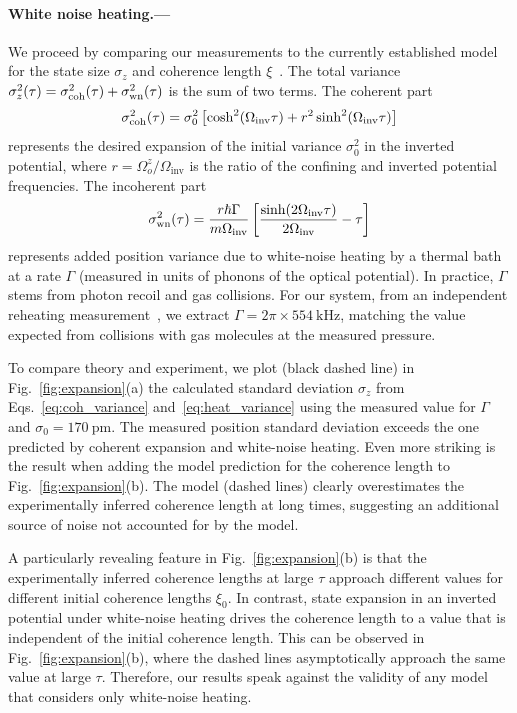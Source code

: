 \documentclass[aps,prl,reprint,twocolumn,superscriptaddress]{revtex4-2}
\begin{document}
\paragraph{White noise heating.---}
We proceed by comparing our measurements to the currently established model for the state size $\sigma_z$ and coherence length $\xi$~\cite{bonvin2024state, tomassi2025accelerated}.
The total variance $\sigma_z^2(\tau)=\sigma^2_{\rm coh}(\tau)+\sigma^2_{\rm wn}(\tau)$ is the sum of two terms. The coherent part 
\begin{equation}
\sigma_{\rm coh}^2(\tau) = \sigma_0^2 \left[\cosh^2(\Omega_{\rm inv}\tau) + r^2 \sinh^2(\Omega_{\rm inv}\tau)\right]
\label{eq:coh_variance}
\end{equation}
represents the desired expansion of the initial variance $\sigma_0^2$ in the inverted potential, where $r=\Omega_o^z/\Omega_\text{inv}$ is the ratio of the confining and inverted potential frequencies. 
The incoherent part 
\begin{equation}
\sigma_{\rm wn}^2(\tau) = \frac{r\hbar\Gamma}{m\Omega_{\rm inv}}\left[\frac{\sinh(2\Omega_{\rm inv}\tau)}{2\Omega_{\rm inv}}-\tau   \right]
\label{eq:heat_variance}
\end{equation}
represents added position variance due to white-noise heating by a thermal bath at a rate $\Gamma$ (measured in units of phonons of the optical potential). In practice, $\Gamma$ stems from photon recoil and gas collisions.
For our system, from an independent reheating measurement~\cite{tebbenjohanns2019cold}, we extract $\Gamma=2\pi \times\SI{554}{\kilo\hertz}$, matching the value expected from collisions with gas molecules at the measured pressure. 



To compare theory and experiment, we plot (black dashed line) in Fig.~\ref{fig:expansion}(a) the calculated standard deviation $\sigma_z$ from Eqs.~\eqref{eq:coh_variance} and~\eqref{eq:heat_variance} using the measured value for $\Gamma$ and $\sigma_0=\SI{170}{\pico\meter}$.
The measured position standard deviation exceeds the one predicted by coherent expansion and white-noise heating. 
Even more striking is the result when adding the model prediction for the coherence length to Fig.~\ref{fig:expansion}(b).
%
%
The model (dashed lines) clearly overestimates the experimentally inferred coherence length at long times, suggesting an additional source of noise not accounted for by the model.

A particularly revealing feature in Fig.~\ref{fig:expansion}(b) is that the experimentally inferred coherence lengths at large $\tau$ approach different values for different initial coherence lengths $\xi_0$. 
In contrast, state expansion in an inverted potential under white-noise heating drives the coherence length to a value that is independent of the initial coherence length. 
This can be observed in Fig.~\ref{fig:expansion}(b), where the dashed lines asymptotically approach the same value at large $\tau$. 
Therefore, our results speak against the validity of any model that considers only white-noise heating.
\end{document}
